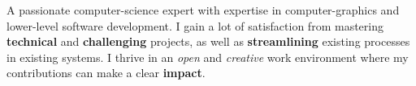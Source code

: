 

\begin{cvparagraph}
	A passionate computer-science expert with expertise in computer-graphics and lower-level software development. I gain a lot of satisfaction from mastering \textbf{technical} and \textbf{challenging} projects, as well as \textbf{streamlining} existing processes in existing systems. I thrive in an \textit{open} and \textit{creative} work environment where my contributions can make a clear \textbf{impact}.
\end{cvparagraph}


